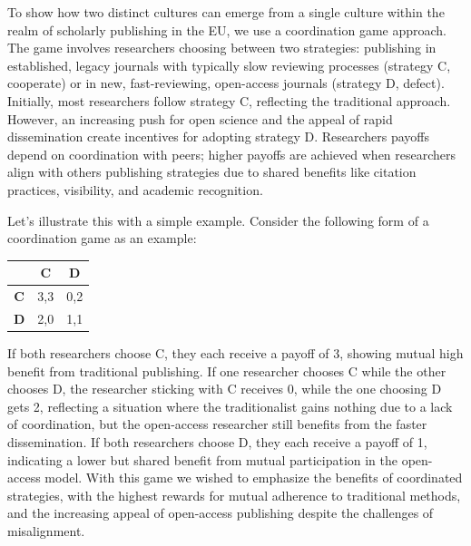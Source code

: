 \documentclass[amsfonts, amssymb, prl, superscriptaddress, notitlepage, twocolumn, nofootinbib]{revtex4-2}
\begin{document}
To show how two distinct cultures can emerge from a single culture within the realm of scholarly publishing in the EU, we use a coordination game approach. The game involves researchers choosing between two strategies: publishing in established, legacy journals with typically slow reviewing processes (strategy C, cooperate) or in new, fast-reviewing, open-access journals (strategy D, defect). Initially, most researchers follow strategy C, reflecting the traditional approach. However, an increasing push for open science and the appeal of rapid dissemination create incentives for adopting strategy D. Researchers payoffs depend on coordination with peers; higher payoffs are achieved when researchers align with others publishing strategies due to shared benefits like citation practices, visibility, and academic recognition.  

 Let's illustrate this with a simple example. Consider the following form of a coordination game as an example: 
 \begin{table}[H]
\centering
\begin{tabular}{c|cc}
    & \textbf{C} & \textbf{D} \\ \hline
    \textbf{C} & 3,3 & 0,2 \\ 
    \textbf{D} & 2,0 & 1,1 \\ 
\end{tabular}
\end{table}

 If both researchers choose C, they each receive a payoff of 3, showing mutual high benefit from traditional publishing. If one researcher chooses C while the other chooses D, the researcher sticking with C receives 0, while the one choosing D gets 2, reflecting a situation where the traditionalist gains nothing due to a lack of coordination, but the open-access researcher still benefits from the faster dissemination. If both researchers choose D, they each receive a payoff of 1, indicating a lower but shared benefit from mutual participation in the open-access model. With this game we wished to emphasize the benefits of coordinated strategies, with the highest rewards for mutual adherence to traditional methods, and the increasing appeal of open-access publishing despite the challenges of misalignment.
\end{document}
